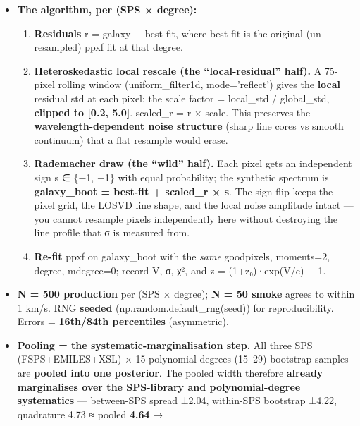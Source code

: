 \documentclass[
]{article}
\providecommand{\tightlist}{%
  \setlength{\itemsep}{0pt}\setlength{\parskip}{0pt}}
\newcommand{\BreakablePath}[1]{{\ttfamily\sloppy #1}}
\begin{document}
\begin{itemize}
\tightlist
\item
  \textbf{The algorithm, per (SPS × degree):}

  \begin{enumerate}
  \def\labelenumi{\arabic{enumi}.}
  \tightlist
  \item
    \textbf{Residuals} r = galaxy − best-fit, where best-fit is the
    original (un-resampled) ppxf fit at that degree.
  \item
    \textbf{Heteroskedastic local rescale (the ``local-residual''
    half).} A 75-pixel rolling window
    (\BreakablePath{uniform\_\discretionary{}{}{}filter1d},
    \BreakablePath{mode='reflect'}) gives the \textbf{local} residual
    std at each pixel; the scale factor = local\_std / global\_std,
    \textbf{clipped to {[}0.2, 5.0{]}}. scaled\_r = r × scale. This
    preserves the \textbf{wavelength-dependent noise structure} (sharp
    line cores vs smooth continuum) that a flat resample would erase.
  \item
    \textbf{Rademacher draw (the ``wild'' half).} Each pixel gets an
    independent sign s ∈ \{−1, +1\} with equal probability; the
    synthetic spectrum is \textbf{galaxy\_boot = best-fit + scaled\_r ×
    s}. The sign-flip keeps the pixel grid, the LOSVD line shape, and
    the local noise amplitude intact --- you cannot resample pixels
    independently here without destroying the line profile that σ is
    measured from.
  \item
    \textbf{Re-fit} ppxf on galaxy\_boot with the \emph{same}
    \BreakablePath{goodpixels}, \BreakablePath{moments=2},
    \BreakablePath{degree}, \BreakablePath{mdegree=0}; record V, σ, χ²,
    and z = (1+z₀)·exp(V/c) − 1.
  \end{enumerate}
\item
  \textbf{N = 500 production} per (SPS × degree); \textbf{N = 50 smoke}
  agrees to within 1 km/s. RNG \textbf{seeded}
  (\BreakablePath{np.\discretionary{}{}{}random.\discretionary{}{}{}default\_\discretionary{}{}{}rng(seed)})
  for reproducibility. Errors = \textbf{16th/84th percentiles}
  (asymmetric).
\item
  \textbf{Pooling = the systematic-marginalisation step.} All three SPS
  (FSPS+EMILES+XSL) × 15 polynomial degrees (15--29) bootstrap samples
  are \textbf{pooled into one posterior}. The pooled width therefore
  \textbf{already marginalises over the SPS-library and
  polynomial-degree systematics} --- between-SPS spread ±2.04,
  within-SPS bootstrap ±4.22, quadrature 4.73 ≈ pooled \textbf{4.64} →

\end{itemize}
\end{document}
